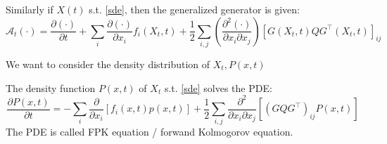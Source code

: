 \begin{theorem}
    Similarly if $X(t)$ s.t. \ref{sde}, then the generalized generator is given:
    \begin{equation}
        \mathcal{A}_t(\cdot)=\frac{\partial(\cdot)}{\partial t}+\sum_{i} \frac{\partial(\cdot)}{\partial x_{i}} f_{i}(X_t, t)+\frac{1}{2} \sum_{i, j}\left(\frac{\partial^{2}(\cdot)}{\partial x_{i} \partial x_{j}}\right)\left[G(X_t, t) Q G^{\top}(X_t, t)\right]_{i j}
    \end{equation}
\end{theorem}
We want to consider the density distribution of $X_t, P(x, t)$
\begin{theorem}
    The density function $P(x, t)$ of $X_t$ s.t. \ref{sde} solves the PDE:
    \begin{equation}
        \frac{\partial P(x, t)}{\partial t}=-\sum_{i} \frac{\partial}{\partial x_{i}}\left[f_{i}(x, t) p(x, t)\right]+\frac{1}{2} \sum_{i, j} \frac{\partial^{2}}{\partial x_{i} \partial x_{j}}\left[\left(G Q G^{\top}\right)_{i j} P(x, t)\right]
    \end{equation}
    The PDE is called FPK equation / forwand Kolmogorov equation.
\end{theorem}
